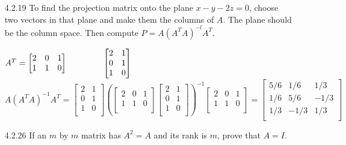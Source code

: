 \documentclass[10pt,twoside,reqno]{article}
\begin{document}
\begin{enumerate}
\item[4.2.19] To find the projection matrix onto the plane $x - y - 2z = 0$, choose two vectors in that plane and make them the columns of $A$. The plane should be the column space. Then compute $P = A(A^T A)^{-l} A^T$. \\
\vspace{3mm}
\begin{center}
$
A^T=
\begin{bmatrix}
2&0&1\\
1&1&0\\
\end{bmatrix}
\hspace{15mm}
\begin{bmatrix}
2&1\\
0&1\\
1&0\\
\end{bmatrix}
$ \\
$
A(A^TA)^{-1}A^T=
\begin{bmatrix}
2&1\\
0&1\\
1&0\\
\end{bmatrix}
\left(
\begin{bmatrix}
2&0&1\\
1&1&0\\
\end{bmatrix}
\begin{bmatrix}
2&1\\
0&1\\
1&0\\
\end{bmatrix}
\right)^{-1}
\begin{bmatrix}
2&0&1\\
1&1&0\\
\end{bmatrix}
=
\begin{bmatrix}
5/6&1/6&1/3\\
1/6&5/6&-1/3\\
1/3&-1/3&1/3\\
\end{bmatrix}
$
\end{center}
\vspace{3mm}
\item[4.2.26] If an $m$ by $m$ matrix has $A^2 = A$ and its rank is $m$, prove that $A = I$. \\

\end{enumerate}
\end{document}
